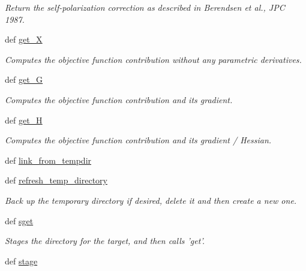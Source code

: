 \begin{DoxyCompactItemize}
\begin{DoxyCompactList}\small\item\em \-Return the self-\/polarization correction as described in \-Berendsen et al., \-J\-P\-C 1987. \end{DoxyCompactList}\item 
def \hyperlink{classforcebalance_1_1target_1_1Target_a606dd136f195c267c05a2455405e5949}{get\-\_\-\-X}
\begin{DoxyCompactList}\small\item\em \-Computes the objective function contribution without any parametric derivatives. \end{DoxyCompactList}\item 
def \hyperlink{classforcebalance_1_1target_1_1Target_afa8cc38c8bba8861c072e789717aa049}{get\-\_\-\-G}
\begin{DoxyCompactList}\small\item\em \-Computes the objective function contribution and its gradient. \end{DoxyCompactList}\item 
def \hyperlink{classforcebalance_1_1target_1_1Target_a1d2ee27fe86a09769c1816af23b09adb}{get\-\_\-\-H}
\begin{DoxyCompactList}\small\item\em \-Computes the objective function contribution and its gradient / \-Hessian. \end{DoxyCompactList}\item 
def \hyperlink{classforcebalance_1_1target_1_1Target_a5aa4958cea0a48138511567a076c5a82}{link\-\_\-from\-\_\-tempdir}
\item 
def \hyperlink{classforcebalance_1_1target_1_1Target_afe815eafab06ac92f10bbf4b88ad95c8}{refresh\-\_\-temp\-\_\-directory}
\begin{DoxyCompactList}\small\item\em \-Back up the temporary directory if desired, delete it and then create a new one. \end{DoxyCompactList}\item 
def \hyperlink{classforcebalance_1_1target_1_1Target_a51d58b55242bf4d4909c1837174f5f3c}{sget}
\begin{DoxyCompactList}\small\item\em \-Stages the directory for the target, and then calls 'get'. \end{DoxyCompactList}\item 
def \hyperlink{classforcebalance_1_1target_1_1Target_af8d2a4658c87841e40296795aec478bb}{stage}

\end{DoxyCompactItemize}
